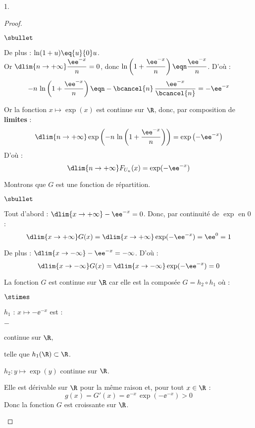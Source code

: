 \documentclass[11pt]{article}%
\begin{document}
\begin{noliste}{1.}
\begin{proof}
\begin{noliste}{$\sbullet$}
\item De plus : $\ln(1+u) \eq{u}{0} u$.\\[.1cm]
  Or $\dlim{n\to+\infty} \dfrac{\ee^{-x}}{n}=0$, donc
  $\ln\left(1+\dfrac{\ee^{-x}}{n}\right) \eqn \dfrac{\ee^{-x}}{n}$.
  D'où :
  \[
   -n \, \ln\left(1+\dfrac{\ee^{-x}}{n}\right) \eqn 
   -\bcancel{n} \, \dfrac{\ee^{-x}}{\bcancel{n}}=-\ee^{-x}
  \]
  \item Or la fonction $x\mapsto \exp(x)$ est continue sur $\R$, donc, 
  par composition de {\bf limites} :
  \[
   \dlim{n\to+\infty} \exp\left(-n \, \ln\left(1+ 
   \dfrac{\ee^{-x}}{n}\right)\right) = \exp\left(-\ee^{-x}\right)
  \]
  D'où :
  \[
   \dlim{n\to+\infty} F_{U_n}(x) = \exp(-\ee^{-x})
  \]
\end{noliste}
Montrons que $G$ est une fonction de répartition.
\begin{noliste}{$\sbullet$}
    \item Tout d'abord : $\dlim{x\to+\infty} -\ee^{-x} = 0$. Donc,
    par continuité de $\exp$ en $0$ : 
    \[
     \dlim{x\to+\infty} G(x)= \dlim{x\to+\infty} \exp(-\ee^{-x})=\ee^0=1
    \]
    
    \item De plus : $\dlim{x\to-\infty} -\ee^{-x}=-\infty$. D'où :
    \[
     \dlim{x\to-\infty} G(x)=\dlim{x\to-\infty} \exp(-\ee^{-x}) =0
    \]
    
  \item La fonction $G$ est continue sur $\R$ car elle est la composée
    $G = h_2\circ h_1$ où :
    \begin{noliste}{$\stimes$}
    \item $h_1$ : $x\mapsto -\ee^{-x}$ est :
      \begin{noliste}{$-$}
      \item continue sur $\R$,
      \item telle que $h_1(\R) \subset \R$.
      \end{noliste}
      
    \item $h_2:y\mapsto \exp(y)$ continue sur $\R$.
    \end{noliste}
    
    \item Elle est dérivable sur $\R$ pour la même raison et, pour 
    tout $x\in\R$ :
    \[
     g(x)=G'(x)=\ee^{-x} \, \exp(-\ee^{-x}) >0
    \]
    Donc la fonction $G$ est croissante sur $\R$.
  \end{noliste}
  

\end{proof}
\end{noliste}
\end{document}
